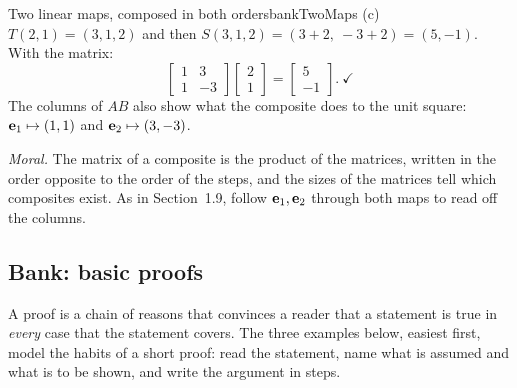 \documentclass[11pt]{article}
\begin{document}
\begin{exmp}{Two linear maps, composed in both orders}{bankTwoMaps}
(c)~$T(2,1)=(3,1,2)$ and then $S(3,1,2)=(3+2,\ -3+2)=(5,-1)$. With the matrix:
\[
\begin{bmatrix}1&3\\1&-3\end{bmatrix}\begin{bmatrix}2\\1\end{bmatrix}=\begin{bmatrix}5\\-1\end{bmatrix}.\ \checkmark
\]
The columns of $AB$ also show what the composite does to the unit square: $\mathbf{e}_1\mapsto(1,1)$ and $\mathbf{e}_2\mapsto(3,-3)$.

\emph{Moral.} The matrix of a composite is the product of the matrices, written in the order opposite to the order of the steps, and the sizes of the matrices tell which composites exist. As in Section~1.9, follow $\mathbf{e}_1,\mathbf{e}_2$ through both maps to read off the columns.
\end{exmp}

\subsection*{Bank: basic proofs}

A proof is a chain of reasons that convinces a reader that a statement is true in \emph{every} case that the statement covers. The three examples below, easiest first, model the habits of a short proof: read the statement, name what is assumed and what is to be shown, and write the argument in steps.
\end{document}
